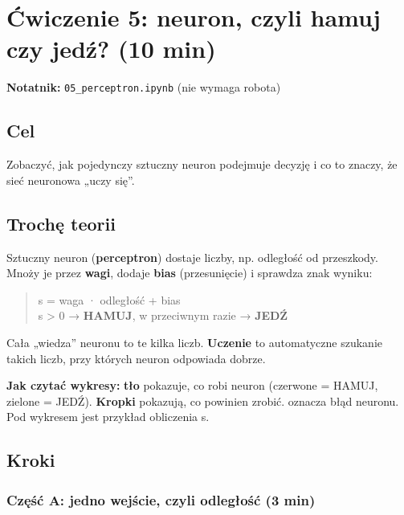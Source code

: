\section{Ćwiczenie 5: neuron, czyli hamuj czy jedź? (10 min)}\label{ux107wiczenie-5-neuron-czyli-hamuj-czy-jedux17a-10-min}

\textbf{Notatnik:} \texttt{05\_perceptron.ipynb} (nie wymaga robota)

\subsection{Cel}\label{cel}

Zobaczyć, jak pojedynczy sztuczny neuron podejmuje decyzję i co to znaczy, że sieć neuronowa „uczy się''.

\subsection{Trochę teorii}\label{trochux119-teorii}

Sztuczny neuron (\textbf{perceptron}) dostaje liczby, np. odległość od przeszkody. Mnoży je przez \textbf{wagi}, dodaje \textbf{bias} (przesunięcie) i sprawdza znak wyniku:

\begin{quote}
s = waga · odległość + bias\\
s \textgreater{} 0 → \textbf{HAMUJ}, w przeciwnym razie → \textbf{JEDŹ}
\end{quote}

Cała „wiedza'' neuronu to te kilka liczb. \textbf{Uczenie} to automatyczne szukanie takich liczb, przy których neuron odpowiada dobrze.

\textbf{Jak czytać wykresy:} \textbf{tło} pokazuje, co robi neuron (czerwone = HAMUJ, zielone = JEDŹ). \textbf{Kropki} pokazują, co powinien zrobić. \textbf{} oznacza błąd neuronu. Pod wykresem jest przykład obliczenia s.

\subsection{Kroki}\label{kroki}

\subsubsection{Część A: jedno wejście, czyli odległość (3 min)}\label{czux119ux15bux107-a-jedno-wejux15bcie-czyli-odlegux142oux15bux107-3-min}

